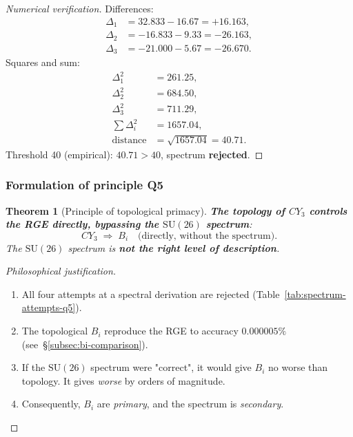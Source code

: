 \documentclass[11pt,a4paper]{article}
\newcommand{\SU}{\ensuremath{\mathrm{SU}}}
\newcommand{\CY}{\ensuremath{CY_3}}
\newtheorem{theorem}{Theorem}[section]
\theoremstyle{definition}
\begin{document}
\begin{proof}[Numerical verification]
Differences:
\begin{align}
    \Delta_1 &= 32.833 - 16.67 = +16.163, \\
    \Delta_2 &= -16.833 - 9.33 = -26.163, \\
    \Delta_3 &= -21.000 - 5.67 = -26.670.
\end{align}
Squares and sum:
\begin{align}
    \Delta_1^2 &= 261.25, \\
    \Delta_2^2 &= 684.50, \\
    \Delta_3^2 &= 711.29, \\
    \sum \Delta_i^2 &= 1657.04, \\
    \text{distance} &= \sqrt{1657.04} = 40.71.
\end{align}
Threshold 40 (empirical): $40.71 > 40$, spectrum \textbf{rejected}.
\end{proof}

\subsubsection{Formulation of principle Q5}

\begin{theorem}[Principle of topological primacy]
\label{thm:topology-primary}
\textbf{The topology of $\CY$ controls the RGE directly, bypassing the $\SU(26)$ spectrum}:
\begin{equation}
    \boxed{
    \CY \;\Rightarrow\; B_i
    \quad \text{(directly, without the spectrum)}.
    }
    \label{eq:topology-primary}
\end{equation}
The $\SU(26)$ spectrum is \textbf{not the right level of description}.
\end{theorem}

\begin{proof}[Philosophical justification]
\begin{enumerate}
    \item All four attempts at a spectral derivation are rejected
          (Table~\ref{tab:spectrum-attempts-q5}).
    \item The topological $B_i$ reproduce the RGE to accuracy
          $0.000005\%$ (see~\S\ref{subsec:bi-comparison}).
    \item If the $\SU(26)$ spectrum were "correct", it would
          give $B_i$ no worse than topology. It gives \emph{worse}
          by orders of magnitude.
    \item Consequently, $B_i$ are \emph{primary},
          and the spectrum is \emph{secondary}.
\end{enumerate}
\end{proof}
\end{document}
